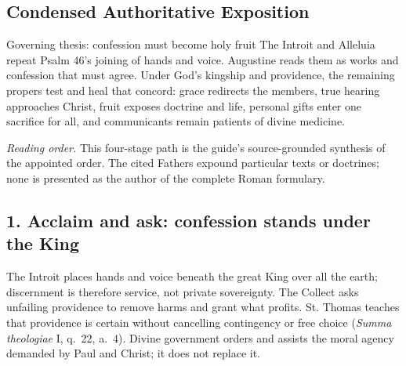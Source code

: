 \begin{deepstudy}

\section*{Condensed Authoritative Exposition}

\begin{massbox}{Governing thesis: confession must become holy fruit}
The Introit and Alleluia repeat Psalm 46's joining of hands and voice. Augustine reads them as works and confession that must agree. Under God's kingship and providence, the remaining propers test and heal that concord: grace redirects the members, true hearing approaches Christ, fruit exposes doctrine and life, personal gifts enter one sacrifice for all, and communicants remain patients of divine medicine.
\end{massbox}

\begin{center}
\end{center}

\noindent\emph{Reading order.} This four-stage path is the guide's source-grounded synthesis of the appointed order. The cited Fathers expound particular texts or doctrines; none is presented as the author of the complete Roman formulary.

\subsection*{1. Acclaim and ask: confession stands under the King}

The Introit places hands and voice beneath the great King over all the earth; discernment is therefore service, not private sovereignty. The Collect asks unfailing providence to remove harms and grant what profits. St. Thomas teaches that providence is certain without cancelling contingency or free choice (\emph{Summa theologiae} I, q.~22, a.~4). Divine government orders and assists the moral agency demanded by Paul and Christ; it does not replace it.


\end{deepstudy}
